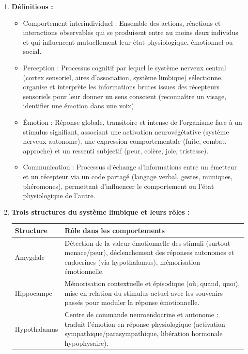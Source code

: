 \documentclass[11pt]{article}
\newcommand{\cle}[1]{{\popxbold\color{popdark}#1}}
\begin{document}
\begin{corrige}
\begin{enumerate}
\item \textbf{Définitions :}
\begin{itemize}
\item \cle{Comportement interindividuel} : Ensemble des actions, réactions et interactions observables qui se produisent entre au moins deux individus et qui influencent mutuellement leur état physiologique, émotionnel ou social.
\item \cle{Perception} : Processus cognitif par lequel le système nerveux central (cortex sensoriel, aires d'association, système limbique) sélectionne, organise et interprète les informations brutes issues des récepteurs sensoriels pour leur donner un sens conscient (reconnaître un visage, identifier une émotion dans une voix).
\item \cle{Émotion} : Réponse globale, transitoire et intense de l'organisme face à un stimulus signifiant, associant une activation neurovégétative (système nerveux autonome), une expression comportementale (fuite, combat, approche) et un ressenti subjectif (peur, colère, joie, tristesse).
\item \cle{Communication} : Processus d'échange d'informations entre un émetteur et un récepteur via un code partagé (langage verbal, gestes, mimiques, phéromones), permettant d'influencer le comportement ou l'état physiologique de l'autre.
\end{itemize}
\item \textbf{Trois structures du système limbique et leurs rôles :}
\begin{center}
\begin{tabularx}{\linewidth}{|l|X|}
\hline
\rowcolor{popblueL} \textbf{Structure} & \textbf{Rôle dans les comportements} \\
\hline
Amygdale & Détection de la valeur émotionnelle des stimuli (surtout menace/peur), déclenchement des réponses autonomes et endocrines (via hypothalamus), mémorisation émotionnelle. \\
\hline
Hippocampe & Mémorisation contextuelle et épisodique (où, quand, quoi), mise en relation du stimulus actuel avec les souvenirs passés pour moduler la réponse émotionnelle. \\
\hline
Hypothalamus & Centre de commande neuroendocrine et autonome : traduit l'émotion en réponse physiologique (activation sympathique/parasympathique, libération hormonale hypophysaire). \\

\end{tabularx}
\end{center}
\end{enumerate}
\end{corrige}
\end{document}
